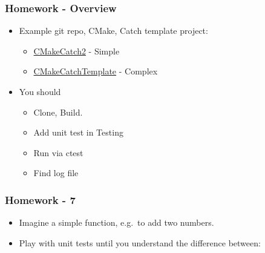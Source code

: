 \hypertarget{homework---overview}{%
\subsubsection{Homework - Overview}\label{homework---overview}}

\begin{itemize}
\tightlist
\item
  Example git repo, CMake, Catch template project:

  \begin{itemize}
  \tightlist
  \item
    \href{https://github.com/MattClarkson/CMakeCatch2}{CMakeCatch2} -
    Simple
  \item
    \href{https://github.com/MattClarkson/CMakeCatchTemplate}{CMakeCatchTemplate}
    - Complex
  \end{itemize}
\item
  You should

  \begin{itemize}
  \tightlist
  \item
    Clone, Build.
  \item
    Add unit test in Testing
  \item
    Run via ctest
  \item
    Find log file
  \end{itemize}
\end{itemize}

\hypertarget{homework---7}{%
\subsubsection{Homework - 7}\label{homework---7}}

\begin{itemize}
\tightlist
\item
  Imagine a simple function, e.g.~to add two numbers.
\item
  Play with unit tests until you understand the difference between:
\end{itemize}

\begin{Shaded}
\begin{Highlighting}[]
  
 \NormalTok{* } \NormalTok{* }
\end{Highlighting}
\end{Shaded}

